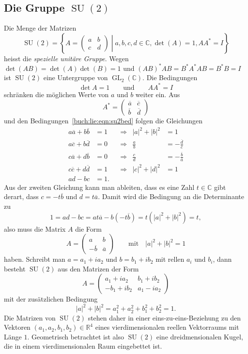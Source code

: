 \subsection{Die Gruppe $\operatorname{SU}(2)$
\label{buch:gruppen:su2}}
Die Menge der Matrizen
\[
\operatorname{SU}(2)
=
\left\{
\left.
A=\begin{pmatrix} a&b\\c&d\end{pmatrix}
\;\right|\;
a,b,c,d\in\mathbb{C},\det(A)=1, AA^*=I
\right\}
\]
heisst die {\em spezielle unitäre Gruppe}.
%
%
%
%
Wegen $\det(AB)=\det(A)\det(B)=1$ und $(AB)^*AB=B^*A^*AB=B^*B=I$ ist 
$\operatorname{SU}(2)$ eine Untergruppe von $\operatorname{GL}_2(\mathbb{C})$.
Die Bedingungen
\begin{equation}
\det A=1
\qquad\text{und}\qquad
AA^*=I
\label{buch:lie:eqn:su2bed}
\end{equation}
schränken die möglichen Werte
von $a$ und $b$ weiter ein.
Aus 
\[
A^*
=
\begin{pmatrix}
\overline{a}&\overline{c}\\
\overline{b}&\overline{d}
\end{pmatrix}
\]
und den Bedingungen~\eqref{buch:lie:eqn:su2bed} folgen die Gleichungen
\[
\begin{aligned}
a\overline{a}+b\overline{b}&=1
&&\Rightarrow&|a|^2+|b|^2&=1
\\
a\overline{c}+b\overline{d}&=0
&&\Rightarrow&
\frac{a}{b}&=-\frac{\overline{d}}{\overline{c}}
\\
c\overline{a}+d\overline{b}&=0
&&\Rightarrow&
\frac{c}{d}&=-\frac{\overline{b}}{\overline{a}}
\\
c\overline{c}+d\overline{d}&=1&&\Rightarrow&|c|^2+|d|^2&=1
\\
ad-bc&=1.
\end{aligned}
\]
Aus der zweiten Gleichung kann man ableiten, dass es eine Zahl $t\in\mathbb{C}$
gibt derart, dass $c=-t\overline{b}$ und $d=t\overline{a}$.
Damit wird die Bedingung an die Determinante zu
\[
1
=
ad-bc = at\overline{a} - b(-t\overline{b})
=
t(|a|^2+|b|^2)
=
t,
\]
also muss die Matrix $A$ die Form 
\[
A
=
\begin{pmatrix}
a&b\\
-\overline{b}&\overline{a}
\end{pmatrix}
\qquad\text{mit}\quad |a|^2+|b|^2=1
\]
haben.
Schreibt man $a=a_1+ia_2$ und $b=b_1+ib_2$ mit rellen $a_i$ und $b_i$,
dann besteht $\operatorname{SU}(2)$  aus den Matrizen der Form
\[
A=
\begin{pmatrix}
 a_1+ia_2&b_1+ib_2\\
-b_1+ib_2&a_1-ia_2
\end{pmatrix}
\]
mit der zusätzlichen Bedingung
\[
|a|^2+|b|^2
=
a_1^2 + a_2^2 + b_1^2 + b_2^2 = 1.
\]
Die Matrizen von $\operatorname{SU}(2)$ stehen daher in einer
eins-zu-eins-Beziehung zu den Vektoren $(a_1,a_2,b_1,b_2)\in\mathbb{R}^4$
eines vierdimensionalen reellen Vektorraums mit Länge $1$.
Geometrisch betrachtet ist also $\operatorname{SU}(2)$ eine dreidmensionalen
Kugel, die in einem vierdimensionalen Raum eingebettet ist.



